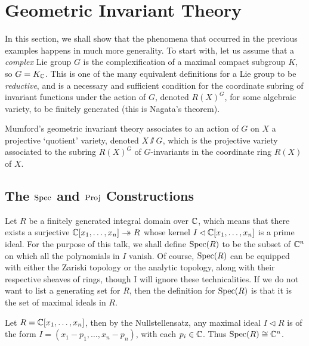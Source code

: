 \section{Geometric Invariant Theory}

In this section, we shall show that the phenomena that occurred in the previous examples happens in much more generality. To start with, let us assume that a \emph{complex} Lie group $G$ is the complexification of a maximal compact subgroup $K$, so $G = K_{\mathbb{C}}$. This is one of the many equivalent definitions for a Lie group to be \emph{reductive}, and is a necessary and sufficient condition for the coordinate subring of invariant functions under the action of $G$, denoted $R(X)^{G}$, for some algebraic variety, to be finitely generated (this is Nagata's theorem).

Mumford's geometric invariant theory associates to an action of $G$ on $X$ a projective `quotient' variety, denoted $X \sslash G$, which is the projective variety associated to the subring $R(X)^{G}$ of $G$-invariants in the coordinate ring $R(X)$ of $X$.

\subsection{The $\operatorname{Spec}$ and $\operatorname{Proj}$ Constructions}

Let $R$ be a finitely generated integral domain over $\mathbb{C}$, which means that there exists a surjective $\mathbb{C}[x_{1},\ldots, x_{n}] \rightarrow\mathrel{\mspace{-15mu}}\rightarrow R$ whose kernel $I \lhd \mathbb{C}[x_{1},\ldots, x_{n}]$ is a prime ideal. For the purpose of this talk, we shall define $\operatorname{Spec}(R)$ to be the subset of $\mathbb{C}^{n}$ on which all the polynomials in $I$ vanish. Of course, $\operatorname{Spec}(R)$ can be equipped with either the Zariski topology or the analytic topology, along with their respective sheaves of rings, though I will ignore these technicalities. If we do not want to list a generating set for $R$, then the definition for $\operatorname{Spec}(R)$ is that it is the set of maximal ideals in $R$.

\begin{ex}
	Let $R = \mathbb{C}[x_{1},\ldots, x_{n}]$, then by the Nullstellensatz, any maximal ideal $I \lhd R$ is of the form $I = (x_{1} - p_{1},\ldots, x_{n} - p_{n})$, with each $p_{i} \in \mathbb{C}$. Thus $\operatorname{Spec}(R) \cong \mathbb{C}^{n}$.
\end{ex}

